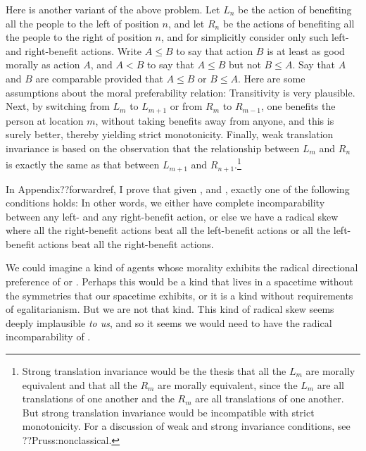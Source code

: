 Here is another variant of the above problem. Let $L_n$ be the action of benefiting all the people to the left of 
position $n$, and let $R_n$ be the actions of benefiting all the people to the right of position $n$, and 
for simplicitly consider only such left- and right-benefit actions. Write $A\le B$ to say that action $B$ 
is at least as good morally as action $A$, and $A<B$ to say that $A\le B$ but not $B\le A$. Say that $A$ and 
$B$ are comparable provided that $A\le B$ or $B\le A$. Here are some assumptions about the 
moral preferability relation:
Transitivity is very plausible. Next, by switching from $L_m$ to $L_{m+1}$ or from $R_m$ to $R_{m-1}$, 
one benefits the person at location $m$, without taking benefits away from anyone, and this is surely 
better, thereby yielding strict monotonicity. Finally, weak translation invariance is based on the observation 
that the relationship between $L_m$ and $R_n$ is exactly the same as that between $L_{m+1}$ and $R_{n+1}$.\footnote{Strong
translation invariance would be the thesis that all the $L_m$ are morally equivalent and that all the $R_m$ are 
morally equivalent, since the $L_m$ are all translations of one another and the $R_m$ are all translations of 
one another. But strong translation invariance would be incompatible with strict monotonicity. For a discussion 
of weak and strong invariance conditions, see ??Pruss:nonclassical.}

In Appendix??forwardref, I prove that given ,  and , exactly
one of the following conditions holds:
In other words, we either have complete incomparability between any left- and any right-benefit action, or else
we have a radical skew where all the right-benefit actions beat all the left-benefit actions or all the 
left-benefit actions beat all the right-benefit actions. 

We could imagine a kind of agents whose morality exhibits the radical directional preference 
of  or . Perhaps this would be a kind that lives in a spacetime 
without the symmetries that our spacetime exhibits, or it is a kind without requirements of 
egalitarianism. But we are not that kind. This kind of radical skew seems deeply implausible 
\textit{to us}, and so it seems we would need to have the radical incomparability of . 

